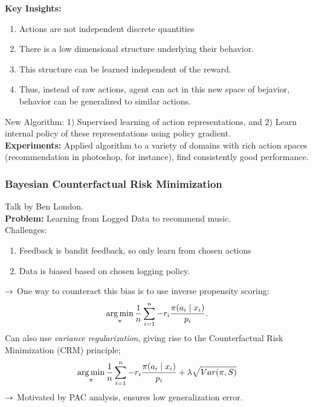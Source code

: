 {\bf Key Insights:}
\begin{enumerate}
    \item Actions are not independent discrete quantities
    \item There is a low dimensional structure underlying their behavior.
    \item This structure can be learned independent of the reward.
    
    \item Thus, instead of raw actions, agent can act in this new space of bejavior, behavior can be generalized to similar actions. 
\end{enumerate}

New Algorithm: 1) Supervised learning of action representations, and 2) Learn internal policy of these representations using policy gradient. \\

{\bf Experiments:} Applied algorithm to a variety of domains with rich action spaces (recommendation in photoshop, for instance), find consistently good performance. \\

\spacerule

\subsubsection{Bayesian Counterfactual Risk Minimization~\cite{london2018bayesian}}

Talk by Ben London. \\

{\bf Problem:} Learning from Logged Data to recommend music. \\

Challenges:
\begin{enumerate}
    \item Feedback is bandit feedback, so only learn from chosen actions
    \item Data is biased based on chosen logging policy.
\end{enumerate}

$\rightarrow$ One way to counteract this bias is to use inverse propensity scoring:
\[
\operatorname*{arg\,min}_{\pi} \frac{1}{n} \sum_{i = 1}^n -r_i \frac{\pi(a_i \mid x_i)}{p_i}.
\]
Can also use {\it variance regularization}, giving rise to the Counterfactual Risk Minimization (CRM) principle;
\[
\operatorname*{arg\,min}_{\pi} \frac{1}{n} \sum_{i = 1}^n -r_i \frac{\pi(a_i \mid x_i)}{p_i} + \lambda \sqrt{Var(\pi, S)}
\]
$\rightarrow$ Motivated by PAC analysis, ensures low generalization error. \\

